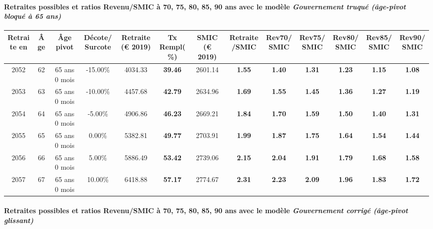 \paragraph{Retraites possibles et ratios Revenu/SMIC à 70, 75, 80, 85, 90 ans avec le modèle \emph{Gouvernement truqué (âge-pivot bloqué à 65 ans)}}  
 
{ \scriptsize \begin{center} 
\begin{tabular}[htb]{|c|c||c|c||c|c||c||c|c|c|c|c|c|} 
\hline 
 Retraite en &  Âge &  Âge pivot &  Décote/Surcote &  Retraite (\euro{} 2019) &  Tx Rempl(\%) &  SMIC (\euro{} 2019) &  Retraite/SMIC &  Rev70/SMIC &  Rev75/SMIC &  Rev80/SMIC &  Rev85/SMIC &  Rev90/SMIC \\ 
\hline \hline 
 2052 &  62 &  65 ans 0 mois &  -15.00\% &  4034.33 &  {\bf 39.46} &  2601.14 &  {\bf 1.55} &  {\bf 1.40} &  {\bf 1.31} &  {\bf 1.23} &  {\bf 1.15} &  {\bf 1.08} \\ 
\hline 
 2053 &  63 &  65 ans 0 mois &  -10.00\% &  4457.68 &  {\bf 42.79} &  2634.96 &  {\bf 1.69} &  {\bf 1.55} &  {\bf 1.45} &  {\bf 1.36} &  {\bf 1.27} &  {\bf 1.19} \\ 
\hline 
 2054 &  64 &  65 ans 0 mois &  -5.00\% &  4906.86 &  {\bf 46.23} &  2669.21 &  {\bf 1.84} &  {\bf 1.70} &  {\bf 1.59} &  {\bf 1.50} &  {\bf 1.40} &  {\bf 1.31} \\ 
\hline 
 2055 &  65 &  65 ans 0 mois &  0.00\% &  5382.81 &  {\bf 49.77} &  2703.91 &  {\bf 1.99} &  {\bf 1.87} &  {\bf 1.75} &  {\bf 1.64} &  {\bf 1.54} &  {\bf 1.44} \\ 
\hline 
 2056 &  66 &  65 ans 0 mois &  5.00\% &  5886.49 &  {\bf 53.42} &  2739.06 &  {\bf 2.15} &  {\bf 2.04} &  {\bf 1.91} &  {\bf 1.79} &  {\bf 1.68} &  {\bf 1.58} \\ 
\hline 
 2057 &  67 &  65 ans 0 mois &  10.00\% &  6418.88 &  {\bf 57.17} &  2774.67 &  {\bf 2.31} &  {\bf 2.23} &  {\bf 2.09} &  {\bf 1.96} &  {\bf 1.83} &  {\bf 1.72} \\ 
\hline 
\hline 
\end{tabular} 
\end{center} } 
\paragraph{Retraites possibles et ratios Revenu/SMIC à 70, 75, 80, 85, 90 ans avec le modèle \emph{Gouvernement corrigé (âge-pivot glissant)}}  
 
